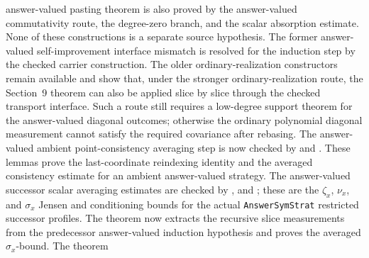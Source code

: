 	answer-valued pasting theorem
	is also proved by the answer-valued commutativity route, the degree-zero
	branch, and the scalar absorption estimate.  None of these constructions is a
	separate source hypothesis.  The former answer-valued self-improvement interface mismatch is
	resolved for the induction step by the checked carrier construction.  The
	older ordinary-realization constructors
	remain available and show that, under the stronger ordinary-realization
	route, the Section~9 theorem can also be applied slice by slice through the
	checked transport interface.  Such a route still requires a low-degree support theorem
	for the answer-valued diagonal outcomes; otherwise the ordinary polynomial
	diagonal measurement cannot satisfy the required covariance after rebasing.
	The answer-valued ambient point-consistency averaging step is now checked by
	and
		.
		These lemmas prove the last-coordinate reindexing identity and the averaged
		consistency estimate for an ambient answer-valued strategy.  The
		answer-valued successor scalar averaging estimates are checked by
		,
		and
		;
		these are the \(\zeta_x\), \(\nu_x\), and \(\sigma_x\) Jensen and
		conditioning bounds for the actual
		\texttt{AnswerSymStrat} restricted successor profiles.  The theorem
		now extracts the recursive slice measurements from the predecessor
		answer-valued induction hypothesis and proves the averaged
		\(\sigma_x\)-bound.  The theorem
